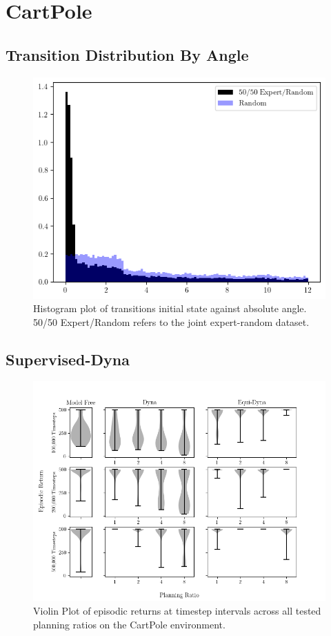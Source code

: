 \section{CartPole}
\subsection{Transition Distribution By Angle}
\begin{figure}[h!]
	\centering
	\includegraphics[width=\textwidth]{Figures/angles_cp.png}
	\caption{Histogram plot of transitions initial state against absolute angle. 50/50 Expert/Random refers to the joint expert-random dataset. }
\end{figure}

\subsection{Supervised-Dyna}\label{ap:supervised-dyna-cp}

\begin{figure}[h!]
	\centering
	\includegraphics[width=\textwidth]{Figures/violin_cp_expert.png}
	\caption{Violin Plot of episodic returns at timestep intervals across all tested planning ratios on the CartPole environment.}
\end{figure}

